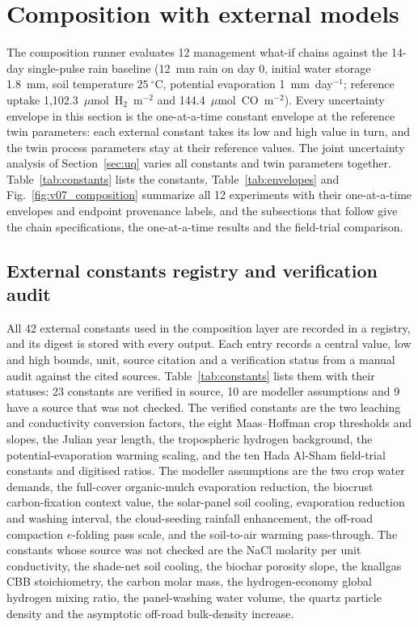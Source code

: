 \documentclass[11pt,a4paper]{article}
\begin{document}
\section{Composition with external models}\label{sec:composition}
The composition runner evaluates 12 management what-if chains against the 14-day single-pulse rain baseline (12~mm rain on day 0, initial water storage 1.8~mm, soil temperature $25~^\circ$C, potential evaporation 1~mm~day$^{-1}$; reference uptake 1,102.3~$\mu$mol~H$_2$~m$^{-2}$ and 144.4~$\mu$mol~CO~m$^{-2}$). Every uncertainty envelope in this section is the one-at-a-time constant envelope at the reference twin parameters: each external constant takes its low and high value in turn, and the twin process parameters stay at their reference values. The joint uncertainty analysis of Section~\ref{sec:uq} varies all constants and twin parameters together. Table~\ref{tab:constants} lists the constants, Table~\ref{tab:envelopes} and Fig.~\ref{fig:v07_composition} summarize all 12 experiments with their one-at-a-time envelopes and endpoint provenance labels, and the subsections that follow give the chain specifications, the one-at-a-time results and the field-trial comparison.

\subsection{External constants registry and verification audit}
All 42 external constants used in the composition layer are recorded in a registry, and its digest is stored with every output. Each entry records a central value, low and high bounds, unit, source citation and a verification status from a manual audit against the cited sources. Table~\ref{tab:constants} lists them with their statuses: 23 constants are verified in source, 10 are modeller assumptions and 9 have a source that was not checked. The verified constants are the two leaching and conductivity conversion factors, the eight Maas--Hoffman crop thresholds and slopes, the Julian year length, the tropospheric hydrogen background, the potential-evaporation warming scaling, and the ten Hada Al-Sham field-trial constants and digitised ratios. The modeller assumptions are the two crop water demands, the full-cover organic-mulch evaporation reduction, the biocrust carbon-fixation context value, the solar-panel soil cooling, evaporation reduction and washing interval, the cloud-seeding rainfall enhancement, the off-road compaction $e$-folding pass scale, and the soil-to-air warming pass-through. The constants whose source was not checked are the NaCl molarity per unit conductivity, the shade-net soil cooling, the biochar porosity slope, the knallgas CBB stoichiometry, the carbon molar mass, the hydrogen-economy global hydrogen mixing ratio, the panel-washing water volume, the quartz particle density and the asymptotic off-road bulk-density increase.
\end{document}
